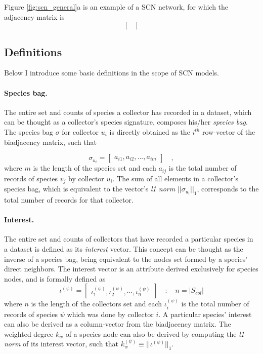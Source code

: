 Figure \ref{fig:scn_general}a is an example of a SCN network, for which the adjacency matrix is
$$
\begin{bmatrix}

\end{bmatrix}
$$

\subsection{Definitions}
Below I introduce some basic definitions in the scope of SCN models.

\paragraph{Species bag.} 
The entire set and counts of species a collector has recorded in a dataset, which can be thought as a collector's species signature, composes his/her \textit{species bag}.
The species bag $\sigma$ for collector $u_i$ is directly obtained as the $i^{th}$ row-vector of the biadjacency matrix, such that

$$
\sigma_{u_i} =  \begin{bmatrix}
a_{i 1}, a_{i 2}, ..., a_{i m}
\end{bmatrix}  \quad ,
$$
where $m$ is the length of the species set and each $a_{i j}$ is the total number of records of species $v_j$ by collector $u_i$. The sum of all elements in a collector's species bag, which is equivalent to the vector's \textit{l1 norm} $||\sigma_{u_i}||_1$, corresponds to the total number of records for that collector.

 
\paragraph{Interest.} 
The entire set and counts of collectors that have recorded a particular species in a dataset is defined as its \textit{interest} vector. This concept can be thought as the inverse of a species bag, being equivalent to the nodes set formed by a species' direct neighbors. The interest vector is an attribute derived exclusively for species nodes, and is formally defined as
$$ 
\iota^{(\psi)} =  \begin{bmatrix}
\iota^{(\psi)}_1, \iota_2^{(\psi)}, \cdots, \iota_n^{(\psi)}
\end{bmatrix}  \quad : \quad 
n = |S_{col}|
$$
where $n$ is the length of the collectors set and each $\iota_i^{(\psi)}$ is the total number of records of species $\psi$ which was done by collector $i$. 
A particular species' interest can also be derived as a column-vector from the biadjacency matrix. 
The weighted degree $k_w$ of a species node can also be derived by computing the \textit{l1-norm} of its interest vector, such that $k_w^{(\psi)} \equiv || \iota^{(\psi)} ||_1 $.

